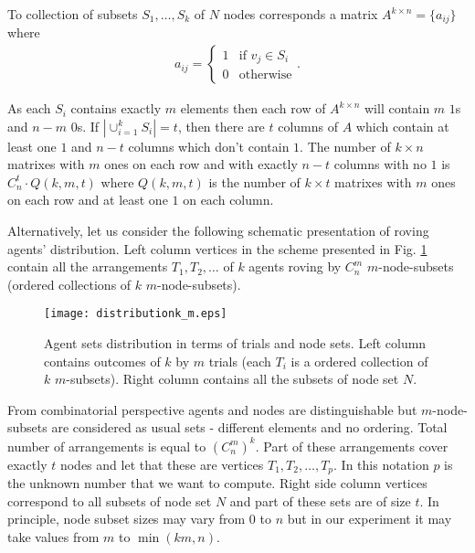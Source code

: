 \documentclass[conference]{IEEEtran}
\begin{document}
To collection of subsets $S_{1},\ldots,S_{k}$ of $N$ nodes corresponds a matrix $A^{k \times n}=\{a_{ij}\}$ where
\begin{align}
 a_{ij} = 
  \begin{cases} 
   1 & \text{if } v_{j}\in S_{i} \\
   0 & \text{otherwise}
  \end{cases}.
\end{align}

As each $S_{i}$ contains exactly $m$ elements then each row of $A^{k \times n}$ will contain $m$ $1$s and $n-m$ $0$s. If $\left|\cup_{i=1}^{k}S_{i}\right|=t$, then there are $t$ columns of $A$ which contain at least one $1$ and $n-t$ columns which don't contain $1$. The number of $k \times n$ matrixes with $m$ ones on each row and with exactly $n-t$ columns with no $1$ is $C_{n}^{t} \cdot Q(k,m,t)$ where $Q(k,m,t)$ is the number of $k \times t$ matrixes with $m$ ones on each row and at least one $1$ on each column. 

Alternatively, let us consider the following schematic presentation of roving agents' distribution. 
Left column vertices in the scheme presented in Fig. \ref{fig:distributionk_m} contain all the arrangements $T_{1},T_{2},\ldots$ of $k$ agents roving by $C_{n}^{m}$ $m$-node-subsets (ordered collections of $k$ $m$-node-subsets).
\begin{figure}[tb]
\begin{center}
\begin{minipage}[h]{\linewidth}  
\texttt{[image: distributionk\_m.eps]}
\end{minipage}
\end{center}
\caption{Agent sets distribution in terms of trials and node sets. Left column contains outcomes of $k$ by $m$ trials (each $T_{i}$ is a ordered collection of $k$ $m$-subsets). Right column contains all the subsets of node set $N$.}
\label{fig:distributionk_m}
\end{figure}
From combinatorial perspective agents and nodes are distinguishable but $m$-node-subsets are considered as usual sets - different elements and no ordering. Total number of arrangements is equal to $\left(C_{n}^{m}\right)^{k}$. Part of these arrangements cover exactly $t$ nodes and let that these are vertices $T_{1},T_{2},\ldots,T_{p}$. In this notation $p$ is the unknown number that we want to compute. Right side column vertices correspond to all subsets of node set $N$ and part of these sets are of size $t$. In principle, node subset sizes may vary from $0$ to $n$ but in our experiment it may take values from $m$ to $\min(km,n)$.
\end{document}
